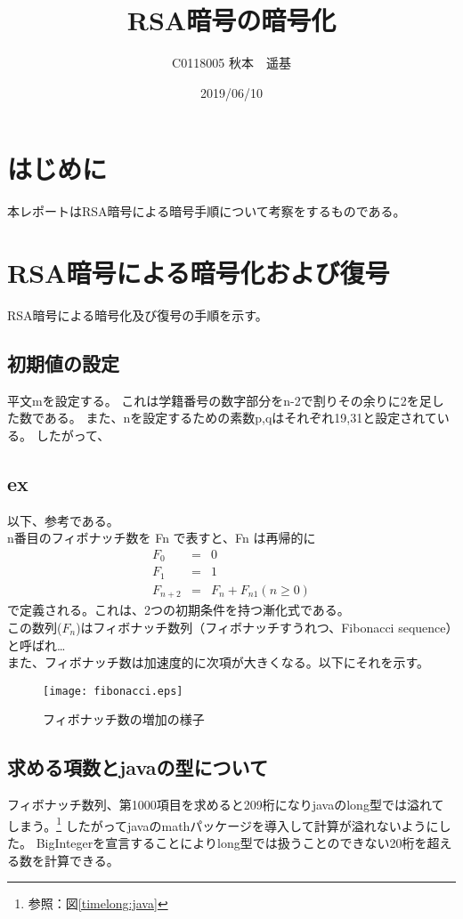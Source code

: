 \documentclass[a4j]{jreport}
\title{RSA暗号の暗号化}
\author{C0118005 秋本　遥基}
\date{2019/06/10}
\begin{document}
\maketitle

\chapter{はじめに}
本レポートはRSA暗号による暗号手順について考察をするものである。
\chapter{RSA暗号による暗号化および復号}
RSA暗号による暗号化及び復号の手順を示す。
\section{初期値の設定}
平文mを設定する。
これは学籍番号の数字部分をn-2で割りその余りに2を足した数である。
また、nを設定するための素数p,qはそれぞれ19,31と設定されている。
したがって、


\section{ex}
以下、参考である。\cite{fibwiki}\\

n番目のフィボナッチ数を Fn で表すと、Fn は再帰的に
\begin{eqnarray}
 F_0 &=& 0 \\
 F_1 &=& 1 \\
 F_{n+2} &=& F_n + F_{n1} (n \ge 0)
\end{eqnarray}
で定義される。これは、2つの初期条件を持つ漸化式である。\\
この数列($F_n$)はフィボナッチ数列（フィボナッチすうれつ、Fibonacci sequence）と呼ばれ… \\

また、フィボナッチ数は加速度的に次項が大きくなる。以下にそれを示す。
\begin{figure}[H]
  \centering
  \texttt{[image: fibonacci.eps]}
  \caption{フィボナッチ数の増加の様子}
  \label{figure:fibonacci}
  \end{figure}
\section{求める項数とjavaの型について}
フィボナッチ数列、第1000項目を求めると209桁になりjavaのlong型では溢れてしまう。\footnote{参照：図\ref{timelong:java}}
したがってjavaのmathパッケージ\cite{jmath}を導入して計算が溢れないようにした。
BigIntegerを宣言することによりlong型では扱うことのできない20桁を超える数を計算できる。\cite{mathmath}
\end{document}
